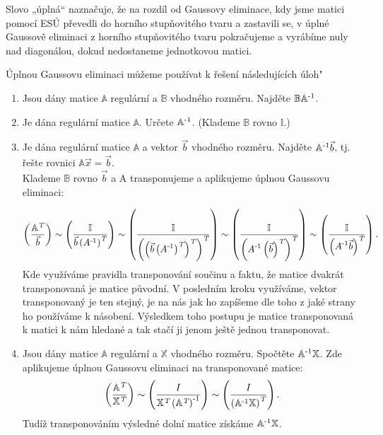 \documentclass[12pt]{article}
\begin{document}
Slovo „úplná“ naznačuje, že na rozdíl od Gaussovy eliminace, kdy jsme matici pomocí ESÚ převedli do horního stupňovitého tvaru a zastavili se, v úplné Gaussově eliminaci z horního stupňovitého tvaru pokračujeme a vyrábíme nuly nad diagonálou, dokud nedostaneme jednotkovou matici.

Úplnou Gaussovu eliminaci můžeme používat k řešení následujících úloh"

\begin{enumerate}
\item {Jsou dány matice $\mathbb{A}$ regulární a $\mathbb{B}$ vhodného rozměru. Najděte $\mathbb{BA^{\text{\normalfont{-1}}}}$.}
\item Je dána regulární matice $\mathbb{A}$. Určete $ \mathbb{A^{\text{\normalfont{-1}}}}$. (Klademe $ \mathbb{B}$ rovno $ \mathbb{I}$.)
\item Je dána regulární matice $\mathbb{A}$ a vektor $\vec{b}$ vhodného rozměru. Najděte $\mathbb{A^{\text{\normalfont{-1}}}}\vec{b}$, tj. řešte rovnici $\mathbb{A}\vec{x}=\vec{b}$. \\ Klademe $\mathbb{B}$ rovno $\vec{b}$ a A transponujeme a aplikujeme úplnou Gaussovu eliminaci:

$$\left(\frac{\mathbb{A^{\textit{T}}}}{\vec{b}}\right) 
\sim \left(\frac{\mathbb{I}}{\vec{b}\left(A^{\text{\normalfont{-1}}}\right)^{\textit{T}}}\right) 
\sim  \left(\frac{\mathbb{I}}{\displaystyle{\left(\left(\vec{b}\left(A^{\text{\normalfont{-1}}}\right)^{\textit{T}}\right)^{\textit{T}}\right)^{\textit{T}}}}\right)
\sim  \left(\frac{\mathbb{I}}{\displaystyle{\left(A^{\text{\normalfont{-1}}}\left(\vec{b}\right)^{\textit{T}}\right)^{\textit{T}}}}\right)  
\sim  \left(\frac{\mathbb{I}}{\displaystyle{\left(A^{\text{\normalfont{-1}}}\vec{b}\right)^{\textit{T}}}}\right) 
.$$
Kde využíváme pravidla transponování součinu a faktu, že matice dvakrát transponovaná je matice původní. V posledním kroku využíváme, vektor transponovaný je ten stejný, je na nás jak ho zapíšeme dle toho z jaké strany ho používáme k násobení. Výsledkem toho postupu je matice transponovaná k matici k nám hledané a tak stačí ji jenom ještě jednou transponovat.
\item Jsou dány matice $\mathbb{A}$ regulární a $\mathbb{X}$ vhodného rozměru. Spočtěte $\mathbb{A^{\text{\normalfont{-1}}}X}$.
Zde aplikujeme úplnou Gaussovu eliminaci na transponované matice:
$$\left(\frac{\mathbb{A^{\textit{T}}}}{\mathbb{X^{\textit{T}}}}\right)
\sim \left(\frac{I}{\mathbb{X^{\textit{T}}}\left(\mathbb{A^{\textit{T}}}\right)^{\text{\normalfont{-1}}}}\right)
\sim \left(\frac{I}{\left(\mathbb{A}^{\text{\normalfont{-1}}}\mathbb{X}\right)^{\textit{T}}}\right).$$
Tudíž transponováním výsledné dolní matice získáme $\mathbb{A}^{\text{\normalfont{-1}}}\mathbb{X}$.
\end{enumerate}
\end{document}
